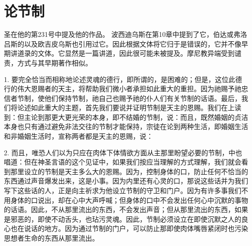 
\chapter{论节制}


圣在他的第231号中提及他的作品。 波西迪乌斯在第10章中提到了它，伯达或弗洛吕斯的以及欧吉皮乌斯也引用过它。因此根据文体将它归于是错误的，它并不像早期讲道录的文体。它显然是一篇讲道，因此很可能未被提及。摩尼教异端受到谴责，方式与其早期著作相似。\par

1. 要完全恰当而相称地论述灵魂的德行，即所谓的，是困难的；但是，这位此德行的伟大恩赐者的天主，将帮助我们微小者承担如此重大的重担。因为祂赐予祂忠信者节制，使他们保持节制，祂自己也赐予祂的仆人们有关节制的话语。最后，我们将论述如此重大的主题，首先我们要说并证明节制是天主的恩赐。我们在上读到：但主论到那更大更光荣的本身，即不结婚的节制，说：而且，既然婚姻的贞洁本身也只有通过避免非法交往的节制才能保持，宗徒在论到两种生活，即婚姻生活和非婚姻生活时，宣称两者都是天主的恩赐，说：\par

2. 而且，唯恐人们以为只应在肉体下体情欲方面从主那里盼望必要的节制，中也唱道：但在神圣言语的这个见证中，如果我们按应当理解的方式理解，我们就会看到那里设立的节制是天主多么大的恩赐。因为，控制身体的口，防止任何不恰当的东西通过声音爆发出来，这是小事。因为内里还有心灵的口，那说这些话并为我们写下这些话的人，正是向主祈求为他设立节制的守卫和门户。因为有许多事我们不用身体的口说出，却在心中大声呼喊；但身体的口中不会发出任何心中沉默的事物的话语。因此，不从那里流出的东西，不会发出声音；但从那里流出的东西，如果是邪恶的，即使不动舌头，也玷污灵魂。因此，节制必须设立在即使沉默之人的良心也在说话的地方。因为通过节制的门户，可以防止那即使肉体嘴唇紧闭时也污染思想者生命的东西从那里流出。\par

